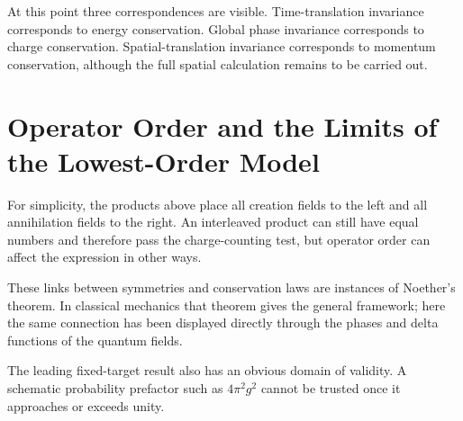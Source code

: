 At this point three correspondences are visible. Time-translation invariance corresponds to energy conservation. Global phase invariance corresponds to charge conservation. Spatial-translation invariance corresponds to momentum conservation, although the full spatial calculation remains to be carried out.

\section{Operator Order and the Limits of the Lowest-Order Model}

For simplicity, the products above place all creation fields to the left and all annihilation fields to the right. An interleaved product can still have equal numbers and therefore pass the charge-counting test, but operator order can affect the expression in other ways.

\begin{classroomqa}
\end{classroomqa}


These links between symmetries and conservation laws are instances of Noether's theorem. In classical mechanics that theorem gives the general framework; here the same connection has been displayed directly through the phases and delta functions of the quantum fields.

The leading fixed-target result also has an obvious domain of validity. A schematic probability prefactor such as \(4\pi^2g^2\) cannot be trusted once it approaches or exceeds unity.

\begin{classroomqa}
\end{classroomqa}

